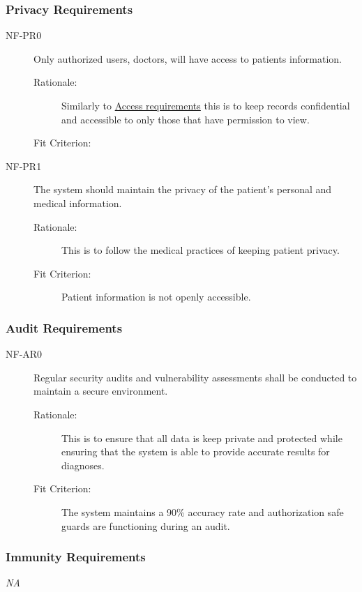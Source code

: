 \documentclass[12pt]{article}
\begin{document}
\subsubsection{Privacy Requirements}
\begin{description}
    \item[NF-PR0] Only authorized users, doctors, will have access to patients information. 
    \begin{description}
        \item[Rationale:] Similarly to \hyperlink{AR0}{Access requirements} this is to keep records confidential and accessible to only those that have permission to view.
        \item[Fit Criterion:]
    \end{description}
    \item[NF-PR1] The system should maintain the privacy of the patient’s personal and medical information.
    \begin{description}
        \item[Rationale:] This is to follow the medical practices of keeping patient privacy. 
        \item[Fit Criterion:] Patient information is not openly accessible. 
    \end{description}
\end{description}


\subsubsection{Audit Requirements}
\begin{description}
    \item[NF-AR0] Regular security audits and vulnerability assessments shall be conducted to maintain a secure environment. 
    \begin{description}
        \item[Rationale:] This is to ensure that all data is keep private and protected while ensuring that the system is able to provide accurate results for diagnoses. 
        \item[Fit Criterion:] The system maintains a 90\% accuracy rate and authorization safe guards are functioning during an audit.
    \end{description}
\end{description}


\subsubsection{Immunity Requirements}
\textit{NA}
\end{document}
